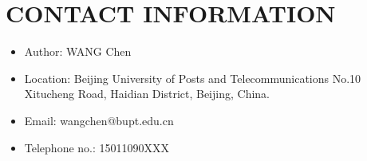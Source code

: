 \documentclass{article}
\begin{document}
\newpage
\section{CONTACT INFORMATION}

\begin{itemize}
\item Author: WANG Chen
\item Location: Beijing University of Posts and Telecommunications No.10 Xitucheng Road, Haidian District, Beijing, China.
\item Email: wangchen@bupt.edu.cn
\item Telephone no.: 15011090XXX
\end{itemize}
\end{document}
